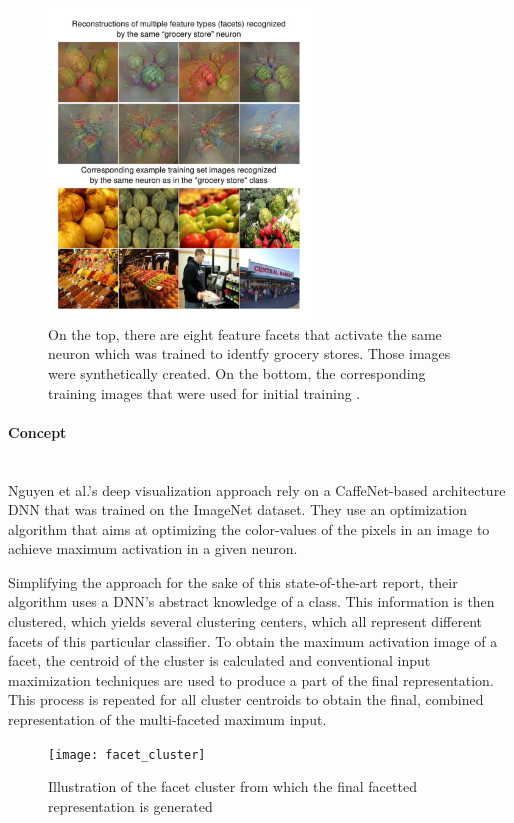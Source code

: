 \documentclass{acmsiggraph}               %
\newcommand{\paragraphbr}[1]{\paragraph{#1}\mbox{}\\}
\begin{document}
\begin{figure}[H]
\center
\includegraphics[width=2.75in]{multi-facet}
\caption{On the top, there are eight feature facets that activate the same neuron which was trained to identfy grocery stores. Those images were synthetically created. On the bottom, the corresponding training images that were used for initial training \protect\cite{Nguyen2016}.}
\label{fig:multi}
\end{figure}

\paragraphbr{Concept}

Nguyen et al.'s deep visualization approach rely on a CaffeNet-based architecture DNN that was trained on the ImageNet dataset. They use an optimization algorithm that aims at optimizing the color-values of the pixels in an image to achieve maximum activation in a given neuron.

Simplifying the approach for the sake of this state-of-the-art report, their algorithm uses a DNN's abstract knowledge of a class. This information is then clustered, which yields several clustering centers, which all represent different facets of this particular classifier. To obtain the maximum activation image of a facet, the centroid of the cluster is calculated and conventional input maximization techniques are used to produce a part of the final representation. This process is repeated for all cluster centroids to obtain the final, combined representation of the multi-faceted maximum input.

\begin{figure}
\center
\texttt{[image: facet\_cluster]}
\caption{Illustration of the facet cluster from which the final facetted representation is generated \protect\cite{Nguyen2016}}
\label{fig:facet_cluster}
\end{figure}
\end{document}
